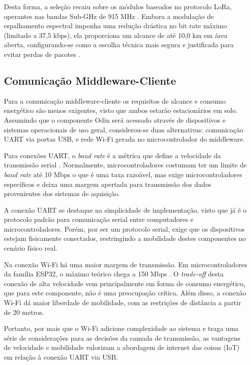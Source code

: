 Desta forma, a seleção recaiu sobre os módulos baseados no protocolo LoRa, operantes nas bandas Sub-GHz de 915 MHz \cite{sx1276_datasheet}. Embora a modulação de espalhamento espectral imponha uma redução drástica no bit rate máximo (limitado a 37,5 kbps), ela proporciona um alcance de até 10,0 km em área aberta, configurando-se como a escolha técnica mais segura e justificada para evitar perdas de pacotes \cite{sx1276_datasheet}.

\subsection{Comunicação Middleware-Cliente}
Para a comunicação middleware-cliente os requisitos de alcance e consumo energético são menos exigentes, visto que ambos estarão estacionários em solo. Assumindo que o componente Odin será acessado através de dispositivos e sistemas operacionais de uso geral, considerou-se duas alternativas: comunicação UART via portas USB, e rede Wi-Fi gerada no microcontrolador do middleware.

Para conexões UART, o \textit{baud rate} é a métrica que define a velocidade da transmissão serial \cite{esp32_datasheet}. Normalmente, microcontroladores costumam ter um limite de \textit{baud rate} até 10 Mbps \cite{STM32F405RG_datasheet} \cite{esp32_datasheet} \cite{atmega328P_datasheet} o que é uma taxa razoável, mas exige microcontroladores específicos e deixa uma margem apertada para transmissão dos dados provenientes dos sistemas de aquisição.

A conexão UART se destaque na simplicidade de implementação, visto que já é o protocolo padrão para comunicação serial entre computadores e microcontroladores. Porém, por ser um protocolo serial, exige que os dispositivos estejam fisicamente conectados, restringindo a mobilidade destes componentes no cenário físico real.

Na conexão Wi-Fi há uma maior margem de transmissão. Em microcontroladores da família ESP32, o máximo teórico chega a 150 Mbps \cite{esp32_datasheet}. O \textit{trade-off} desta conexão de alta velocidade vem principalmente em forma de consumo energético, que para este componente, não é uma preocupação crítica. Além disso, a conexão Wi-Fi dá maior liberdade de mobilidade, com as restrições de distância a partir de 20 metros.

Portanto, por mais que o Wi-Fi adicione complexidade ao sistema e traga uma série de considerações para as decisões da camada de transmissão, as vantagens de velocidade e mobilidade valorizam a abordagem de internet das coisas (IoT) em relação à conexão UART via USB.

